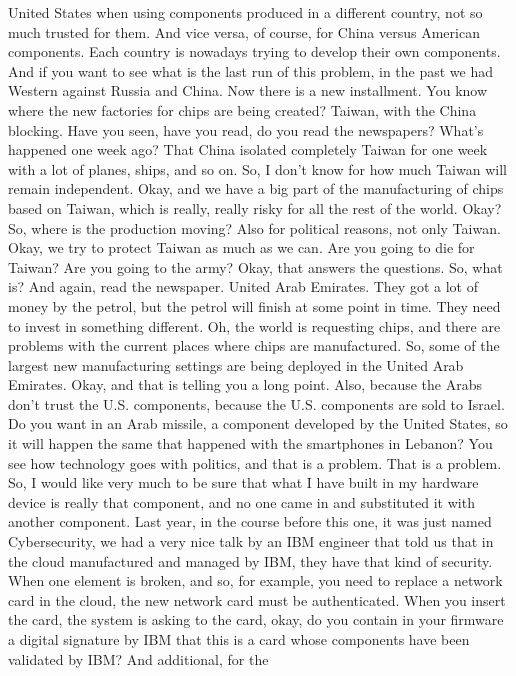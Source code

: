  United States when using components produced in a different country, not so
 much trusted for them. And vice versa, of course, for China versus American
 components. Each country is nowadays trying to develop their own components.
 And if you want to see what is the last run of this problem, in the past we
 had Western against Russia and China. Now there is a new installment. You know
 where the new factories for chips are being created? Taiwan, with the China
 blocking. Have you seen, have you read, do you read the newspapers? What's
 happened one week ago? That China isolated completely Taiwan for one week with
 a lot of planes, ships, and so on. So, I don't know for how much Taiwan will
 remain independent. Okay, and we have a big part of the manufacturing of chips
 based on Taiwan, which is really, really risky for all the rest of the world.
 Okay? So, where is the production moving? Also for political reasons, not only
 Taiwan. Okay, we try to protect Taiwan as much as we can. Are you going to die
 for Taiwan? Are you going to the army? Okay, that answers the questions. So,
 what is? And again, read the newspaper. United Arab Emirates. They got a lot
 of money by the petrol, but the petrol will finish at some point in time. They
 need to invest in something different. Oh, the world is requesting chips, and
 there are problems with the current places where chips are manufactured. So,
 some of the largest new manufacturing settings are being deployed in the
 United Arab Emirates. Okay, and that is telling you a long point. Also,
 because the Arabs don't trust the U.S. components, because the U.S. components
 are sold to Israel. Do you want in an Arab missile, a component developed by
 the United States, so it will happen the same that happened with the
 smartphones in Lebanon? You see how technology goes with politics, and that is
 a problem. That is a problem. So, I would like very much to be sure that what
 I have built in my hardware device is really that component, and no one came
 in and substituted it with another component. Last year, in the course before
 this one, it was just named Cybersecurity, we had a very nice talk by an IBM
 engineer that told us that in the cloud manufactured and managed by IBM, they
 have that kind of security. When one element is broken, and so, for example,
 you need to replace a network card in the cloud, the new network card must be
 authenticated. When you insert the card, the system is asking to the card,
 okay, do you contain in your firmware a digital signature by IBM that this is
 a card whose components have been validated by IBM? And additional, for the
